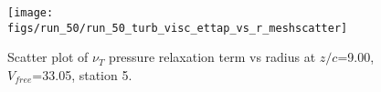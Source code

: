 \begin{figure}[H]
\centering
\texttt{[image: figs/run\_50/run\_50\_turb\_visc\_ettap\_vs\_r\_meshscatter]}
\caption{Scatter plot of $\nu_T$ pressure relaxation term vs radius at $z/c$=9.00, $V_{free}$=33.05, station 5.}
\label{fig:run_50_turb_visc_ettap_vs_r_meshscatter}
\end{figure}


